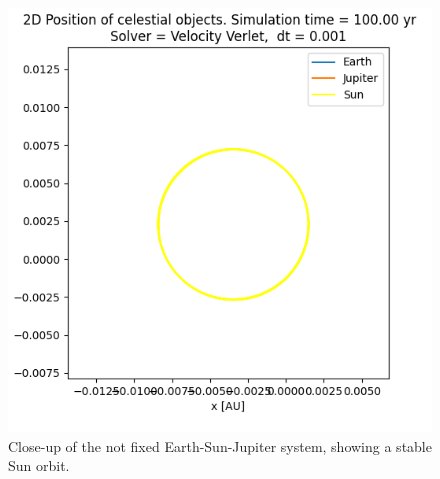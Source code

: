 \documentclass[american,a4paper,12pt]{article}
\begin{document}
\begin{figure}[H]
\begin{minipage}[b]{0.49\textwidth}
    \includegraphics[width=\textwidth]{figures/ESJ_Sun_drift.png}
    \caption{Close-up of the not fixed Earth-Sun-Jupiter system, showing a stable Sun orbit.}
    \label{fig:ESJ_Sun}
  \end{minipage}
\end{figure}

\newpage
\end{document}
